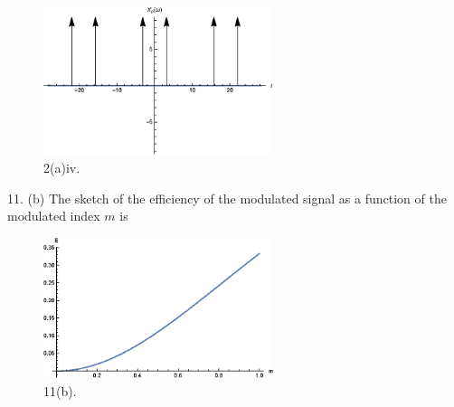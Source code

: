 \documentclass[a4paper]{article}
\begin{document}
\begin{figure}[H]
    \begin{center}
        \includegraphics[width=0.6\textwidth]{2(a)iv.eps}
    \end{center}
    \caption{2(a)iv.}
\end{figure}

11. (b) The sketch of the efficiency of the modulated signal as a function of the modulated index $m$ is
\begin{figure}[H]
    \begin{center}
        \includegraphics[width=0.6\textwidth]{11(b).eps}
    \end{center}
    \caption{11(b).}
\end{figure}
\end{document}
